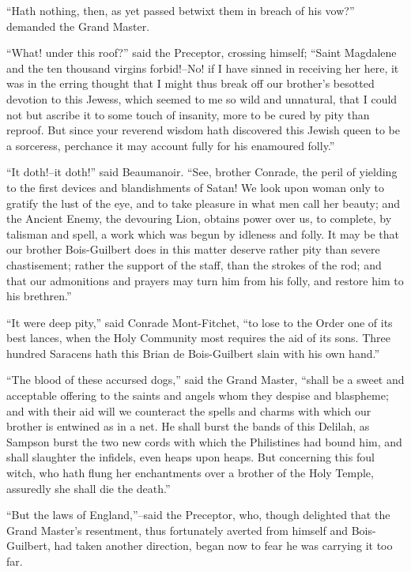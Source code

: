 ``Hath nothing, then, as yet passed betwixt them in breach of his vow?''
demanded the Grand Master.

``What! under this roof?'' said the Preceptor, crossing himself; ``Saint
Magdalene and the ten thousand virgins forbid!--No! if I have sinned in
receiving her here, it was in the erring thought that I might thus break
off our brother's besotted devotion to this Jewess, which seemed to me
so wild and unnatural, that I could not but ascribe it to some touch of
insanity, more to be cured by pity than reproof. But since your reverend
wisdom hath discovered this Jewish queen to be a sorceress, perchance it
may account fully for his enamoured folly.''

``It doth!--it doth!'' said Beaumanoir. ``See, brother Conrade, the
peril of yielding to the first devices and blandishments of Satan! We
look upon woman only to gratify the lust of the eye, and to take
pleasure in what men call her beauty; and the Ancient Enemy, the
devouring Lion, obtains power over us, to complete, by talisman and
spell, a work which was begun by idleness and folly. It may be that our
brother Bois-Guilbert does in this matter deserve rather pity than
severe chastisement; rather the support of the staff, than the strokes
of the rod; and that our admonitions and prayers may turn him from his
folly, and restore him to his brethren.''

``It were deep pity,'' said Conrade Mont-Fitchet, ``to lose to the Order
one of its best lances, when the Holy Community most requires the aid of
its sons. Three hundred Saracens hath this Brian de Bois-Guilbert slain
with his own hand.''

``The blood of these accursed dogs,'' said the Grand Master, ``shall be
a sweet and acceptable offering to the saints and angels whom they
despise and blaspheme; and with their aid will we counteract the spells
and charms with which our brother is entwined as in a net. He shall
burst the bands of this Delilah, as Sampson burst the two new cords with
which the Philistines had bound him, and shall slaughter the infidels,
even heaps upon heaps. But concerning this foul witch, who hath flung
her enchantments over a brother of the Holy Temple, assuredly she shall
die the death.''

``But the laws of England,''--said the Preceptor, who, though delighted
that the Grand Master's resentment, thus fortunately averted from
himself and Bois-Guilbert, had taken another direction, began now to
fear he was carrying it too far.

